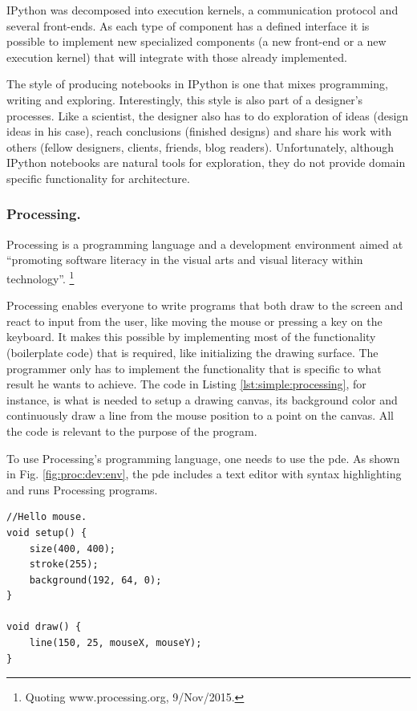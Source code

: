 \documentclass{./llncs2e/llncs}
\begin{document}
	IPython was decomposed into execution kernels, a communication protocol and several front-ends. 
	As each type of component has a defined interface it is possible to implement new specialized components (a new front-end or a new execution kernel) that will integrate with those already implemented.
	
	The style of producing notebooks in IPython is one that mixes programming, writing and exploring. 
	Interestingly, this style is also part of a designer's processes. 
	Like a scientist, the designer also has to do exploration of ideas (design ideas in his case), reach conclusions (finished designs) and share his work with others (fellow designers, clients, friends, blog readers). 
	Unfortunately, although IPython notebooks are natural tools for exploration, they do not provide domain specific functionality for architecture.
	
	
\subsubsection{Processing.}
	Processing\cite{reas2007processing} is a programming language and a development environment aimed at ``promoting software literacy in the visual arts and visual literacy within technology''.
	\footnote{Quoting www.processing.org, 9/Nov/2015.}
	
	Processing enables everyone to write programs that both draw to the screen and react to input from the user, like moving the mouse or pressing a key on the keyboard.
	It makes this possible by implementing most of the functionality (boilerplate code) that is required, like initializing the drawing surface.
	The programmer only has to implement the functionality that is specific to what result he wants to achieve.
	The code in Listing \ref{lst:simple:processing}, for instance, is what is needed to setup a drawing canvas, its background color and continuously draw a line from the mouse position to a point on the canvas.
	All the code is relevant to the purpose of the program.
	
	To use Processing's programming language, one needs to use the \ac{pde}.
	As shown in Fig. \ref{fig:proc:dev:env}, the \ac{pde} includes a text editor with syntax highlighting and runs Processing programs.

	\lstset{ %
		basicstyle=\tt\small,
		numbers=left,
		numberstyle=\tt\small,
		frame=lines,
	}
	\begin{lstlisting}[caption={A simple Processing sketch.},label={lst:simple:processing},float]
//Hello mouse.
void setup() {
	size(400, 400);
	stroke(255);
	background(192, 64, 0);
}

void draw() {
	line(150, 25, mouseX, mouseY);
}
	\end{lstlisting}
	
\end{document}

